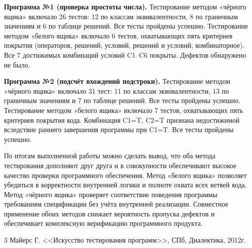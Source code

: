 \documentclass{article}[14pt]
\begin{document}
\textbf{Программа №1 (проверка простоты числа).}
Тестирование методом «чёрного ящика» включало 26 тестов: 12 по классам эквивалентности,
8 по граничным значениям и 6 по таблице решений. Все тесты пройдены успешно.
Тестирование методом «белого ящика» включало 6 тестов, охватывающих пять критериев покрытия
(операторов, решений, условий, решений и условий, комбинаторное). Все 7 достижимых комбинаций
условий C1--C6 покрыты. Дефектов обнаружено не было.

\textbf{Программа №2 (подсчёт вхождений подстроки).}
Тестирование методом «чёрного ящика» включало 31 тест: 11 по классам эквивалентности,
13 по граничным значениям и 7 по таблице решений. Все тесты пройдены успешно.
Тестирование методом «белого ящика» включало 7 тестов, охватывающих пять критериев покрытия
кода. Комбинация C1=T, C2=T признана недостижимой вследствие раннего завершения программы
при C1=T. Все тесты пройдены успешно.

По итогам выполненной работы можно сделать вывод, что оба метода тестирования дополняют
друг друга и в совокупности обеспечивают высокое качество проверки программного обеспечения.
Метод «белого ящика» позволяет убедиться в корректности внутренней логики и полноте охвата
всех ветвей кода. Метод «чёрного ящика» проверяет соответствие поведения программы требованиям
спецификации без учёта внутренней реализации. Совместное применение обоих методов снижает
вероятность пропуска дефектов и обеспечивает комплексную верификацию программного продукта.

\pagebreak

\begin{thebibliography}{3}
	\bibitem{[1]} Майерс Г. <<Искусство тестирования программ>>, СПб, Диалектика, 2012г.
\end{thebibliography}
\end{document}
